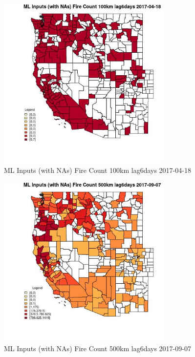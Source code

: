 \begin{figure} 
\centering  
\includegraphics[width=0.77\textwidth]{Code_Outputs/Report_ML_input_PM25_Step4_part_e_de_duplicated_aves_compiled_2019-05-21wNAs_CountyFire_Count_100km_lag6daysMean2017-04-18.jpg} 
\caption{\label{fig:Report_ML_input_PM25_Step4_part_e_de_duplicated_aves_compiled_2019-05-21wNAsCountyFire_Count_100km_lag6daysMean2017-04-18}ML Inputs (with NAs) Fire Count 100km lag6days 2017-04-18} 
\end{figure} 
 

\begin{figure} 
\centering  
\includegraphics[width=0.77\textwidth]{Code_Outputs/Report_ML_input_PM25_Step4_part_e_de_duplicated_aves_compiled_2019-05-21wNAs_CountyFire_Count_500km_lag6daysMean2017-09-07.jpg} 
\caption{\label{fig:Report_ML_input_PM25_Step4_part_e_de_duplicated_aves_compiled_2019-05-21wNAsCountyFire_Count_500km_lag6daysMean2017-09-07}ML Inputs (with NAs) Fire Count 500km lag6days 2017-09-07} 
\end{figure} 
 

